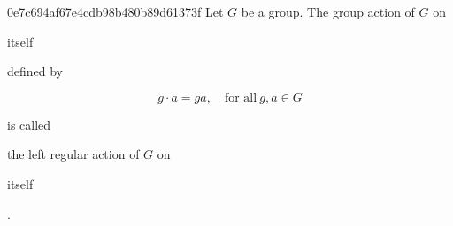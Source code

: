 \begin{note}{0e7c694af67e4cdb98b480b89d61373f}
    Let \({ G }\) be a group.
    The group action of \({ G }\) on \begin{icloze}{3}itself\end{icloze} defined by
    \begin{icloze}{1}
        \[
            g \cdot a = ga, \quad \text{for all}\ g, a \in G
        \]
    \end{icloze}
    is called \begin{icloze}{2}the left regular action of \({ G }\) on \begin{icloze}{3}itself\end{icloze}.\end{icloze}
\end{note}


